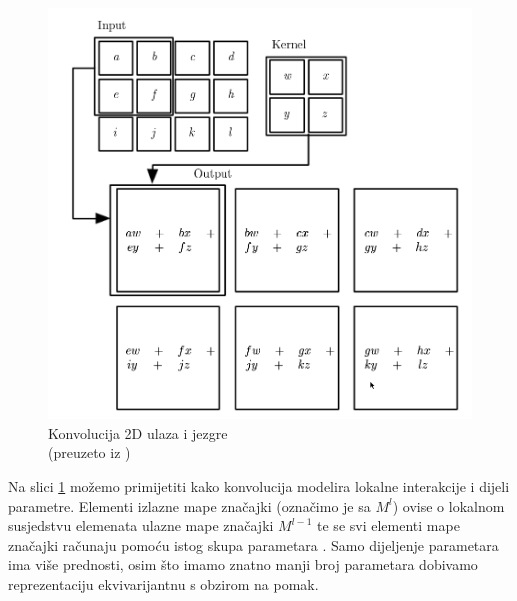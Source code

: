 \documentclass[times, utf8, diplomski]{fer}
\theoremstyle{definition}
\begin{document}
\begin{figure}[h]
\centering
\includegraphics[scale=0.47]{convolution.png}
\caption{Konvolucija 2D ulaza i jezgre \\ (preuzeto iz \cite{Goodfellow-et-al-2016})}
\label{konvolucija_i_jezgra}
\end{figure}

Na slici \ref{konvolucija_i_jezgra} možemo primijetiti kako konvolucija modelira lokalne interakcije i dijeli parametre. Elementi  izlazne mape značajki (označimo je sa $M^l$) ovise o lokalnom susjedstvu elemenata ulazne mape značajki $M^{l-1}$ te se svi elementi mape značajki računaju pomoću istog skupa parametara . Samo dijeljenje parametara ima više prednosti, osim što imamo znatno manji broj parametara dobivamo reprezentaciju ekvivarijantnu s obzirom na pomak.
\end{document}
